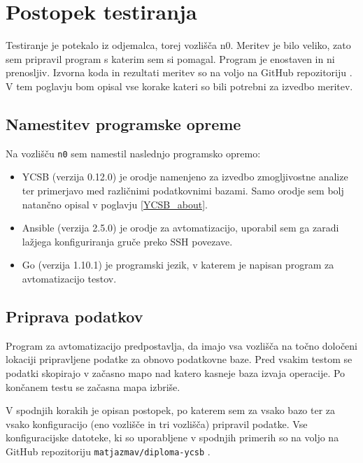 \documentclass[a4paper, 12pt]{book}
\begin{document}
\section{Postopek testiranja}
\label{YCSB_benchmarking_steps}
Testiranje je potekalo iz odjemalca, torej vozlišča n0. Meritev je bilo veliko, zato sem pripravil program s katerim sem si pomagal. Program je enostaven in ni prenosljiv. Izvorna koda in rezultati meritev so na voljo na GitHub repozitoriju \cite{matjazmav/diploma-ycsb}. V tem poglavju bom opisal vse korake kateri so bili potrebni za izvedbo meritev.

\subsection{Namestitev programske opreme}
Na vozlišču \texttt{n0} sem namestil naslednjo programsko opremo:
\begin{itemize}
    \item YCSB (verzija 0.12.0) \cite{brianfrankcooper/YCSB} je orodje namenjeno za izvedbo zmogljivostne analize ter primerjavo med različnimi podatkovnimi bazami. Samo orodje sem bolj natančno opisal v poglavju \ref{YCSB_about}.
    \item Ansible (verzija 2.5.0) \cite{Ansible} je orodje za avtomatizacijo, uporabil sem ga zaradi lažjega konfiguriranja gruče preko SSH povezave.
    \item Go (verzija 1.10.1) \cite{Golang} je programski jezik, v katerem je napisan program za avtomatizacijo testov.
\end{itemize} 

\subsection{Priprava podatkov}
\label{benchmarking-prepare-data}
Program za avtomatizacijo predpostavlja, da imajo vsa vozlišča na točno določeni lokaciji pripravljene podatke za obnovo podatkovne baze. Pred vsakim testom se podatki skopirajo v začasno mapo nad katero kasneje baza izvaja operacije. Po končanem testu se začasna mapa izbriše.

V spodnjih korakih je opisan postopek, po katerem sem za vsako bazo ter za vsako konfiguracijo (eno vozlišče in tri vozlišča) pripravil podatke. Vse konfiguracijske datoteke, ki so uporabljene v spodnjih primerih so na voljo na GitHub repozitoriju \texttt{matjazmav/diploma-ycsb} \cite{matjazmav/diploma-ycsb}.
\end{document}
